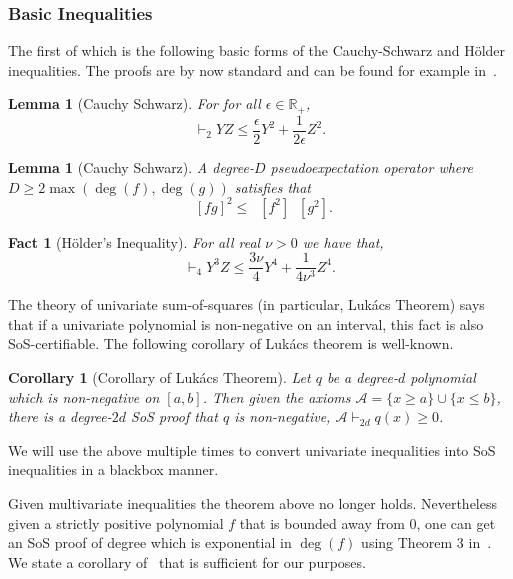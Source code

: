 \documentclass[11pt]{article}
\DeclareMathOperator*{\pE}{\widetilde{\mathbb{E}}}
\def \R {\mathbb{R}}
\def \cA {\mathcal{A}}
\def \sos {SoS\xspace}
\newtheorem{fact}[theorem]{Fact}
\newtheorem{corollary}[theorem]{Corollary}
\newtheorem{lemma}[theorem]{Lemma}
\theoremstyle{definition}
\begin{document}
\subsubsection{Basic Inequalities}
The first of which is the following basic forms of the Cauchy-Schwarz and H\"{o}lder inequalities. 
The proofs are by now standard and can be found for example in~\cite{BarakKS14,ODonnellZ13}.
\begin{lemma}[Cauchy Schwarz]\label{CS1-prelim}
For for all $\epsilon \in \R_+$, 
$$
\vdash_2 YZ \leq \frac{\epsilon}{2}Y^2 + \frac{1}{2\epsilon}Z^2.
$$
\end{lemma}

\begin{lemma}[Cauchy Schwarz]\label{CS2-prelim}
A degree-$D$ pseudoexpectation operator where 
$D \geq  2\max(\deg(f),\deg(g))$ satisfies that
$$\pE[fg]^2 \leq \pE[f^2]\pE[g^2].$$
\end{lemma}


\begin{fact}[H\"{o}lder's Inequality]\label{fact:sos-hol}
For all real $\nu > 0$ we have that,
$$\vdash_4 Y^3 Z \leq \frac{3\nu}{4} Y^4 + \frac{1}{4\nu^3}Z^4.$$ 
\end{fact}



The theory of univariate sum-of-squares (in particular, Luk\'{a}cs Theorem) says that if a univariate polynomial is non-negative on an interval, this fact is also SoS-certifiable. The following  corollary of Luk\'{a}cs theorem is well-known.
\begin{corollary}[Corollary of Luk\'{a}cs Theorem]\label{cor:Lukacs}
Let $q$ be a degree-$d$ polynomial which is non-negative on $[a,b]$.
Then given the axioms $\cA = \{x \ge a\} \cup\{x \le b\}$, there is a degree-$2d$ \sos proof that $q$ is non-negative, $\cA \vdash_{2d} q(x) \ge 0$.
\end{corollary}
We will use the above multiple times to convert univariate inequalities into \sos inequalities in a blackbox manner.


Given multivariate inequalities the theorem above no longer holds. Nevertheless given a strictly positive polynomial $f$ that is bounded away from $0$, one can get an \sos proof of degree which is exponential in $\deg(f)$ using Theorem 3 in~\cite{schweighofer}. We state a corollary of~\cite{schweighofer} that is sufficient for our purposes. 
\end{document}
